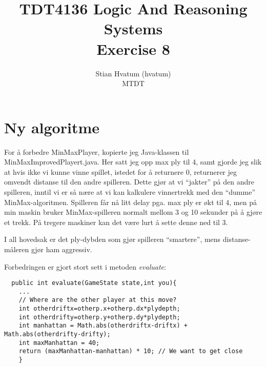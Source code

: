 \documentclass[norsk,a4paper]{article}
\title{TDT4136 Logic And Reasoning Systems\\
{\Huge Exercise 8}}
\author{Stian Hvatum (hvatum)\\MTDT}
\begin{document}
\maketitle
\thispagestyle{empty}
\newpage
{}
\tableofcontents
\newpage
{}
\section{Ny algoritme}
For å forbedre MinMaxPlayer, kopierte jeg Java-klassen til
MinMaxImprovedPlayert.java. Her satt jeg opp max ply til 4, samt gjorde jeg slik
at hvis ikke vi kunne vinne spillet, istedet for å returnere 0, returnerer jeg omvendt distanse til den andre spilleren. Dette gjør at vi ``jakter'' på den
andre spilleren, inntil vi er så nære at vi kan kalkulere vinnertrekk med den
``dumme'' MinMax-algoritmen. Spilleren får nå litt delay pga. max ply er økt til
4, men på min maskin bruker MinMax-spilleren normalt mellom 3 og 10 sekunder på
å gjøre et trekk. På tregere maskiner kan det være lurt å sette denne ned til 3.

I all hovedsak er det ply-dybden som gjør spilleren ``smartere'', mens
distanse-måleren gjør ham aggressiv.

Forbedringen er gjort stort sett i metoden \emph{evaluate}:
\lstset{language=java}
\begin{lstlisting}
  public int evaluate(GameState state,int you){
    ...
    // Where are the other player at this move?
    int otherdriftx=otherp.x+otherp.dx*plydepth;
    int otherdrifty=otherp.y+otherp.dy*plydepth;
    int manhattan = Math.abs(otherdriftx-driftx) + Math.abs(otherdrifty-drifty);
    int maxManhattan = 40;
    return (maxManhattan-manhattan) * 10; // We want to get close
    }
\end{lstlisting}
\end{document}
